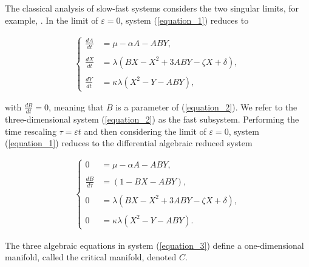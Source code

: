 \documentclass{ws-ijbc}
\begin{document}
The classical analysis of slow-fast systems considers the two singular limits, for example, \cite{MMO}.  In the limit of $\varepsilon = 0$, system (\ref{equation_1}) reduces to
    
\begin{equation}
\begin{aligned}
\begin{cases}
\frac{dA}{dt} &= \mu - \alpha A - ABY, \\ \\
\frac{dX}{dt} &= \lambda(BX - X^2 +3ABY - \zeta X + \delta), \\ \\
\frac{dY}{dt} &= \kappa \lambda(X^2 - Y - ABY),
\end{cases}
\end{aligned}
\label{equation_2}
\end{equation}
    
\noindent
with $\frac{dB}{dt}=0$, meaning that $B$ is a parameter of (\ref{equation_2}).  We refer to the three-dimensional system (\ref{equation_2}) as the fast subsystem.  Performing the time rescaling $\tau = \varepsilon t$ and then considering the limit of $\varepsilon = 0$, system (\ref{equation_1}) reduces to the differential algebraic reduced system
    
 \begin{equation}
\begin{aligned}
\begin{cases}
0 &= \mu - \alpha A - ABY, \\ \\
\frac{dB}{d\tau} &= (1-BX - ABY), \\ \\
0 &= \lambda (BX - X^2 +3ABY - \zeta X + \delta), \\ \\
0 &= \kappa \lambda(X^2 - Y - ABY).
\end{cases}
\end{aligned}
\label{equation_3}
\end{equation}
    
\noindent
The three algebraic equations in system (\ref{equation_3}) define a one-dimensional manifold, called the critical manifold, denoted $C$.
\end{document}
